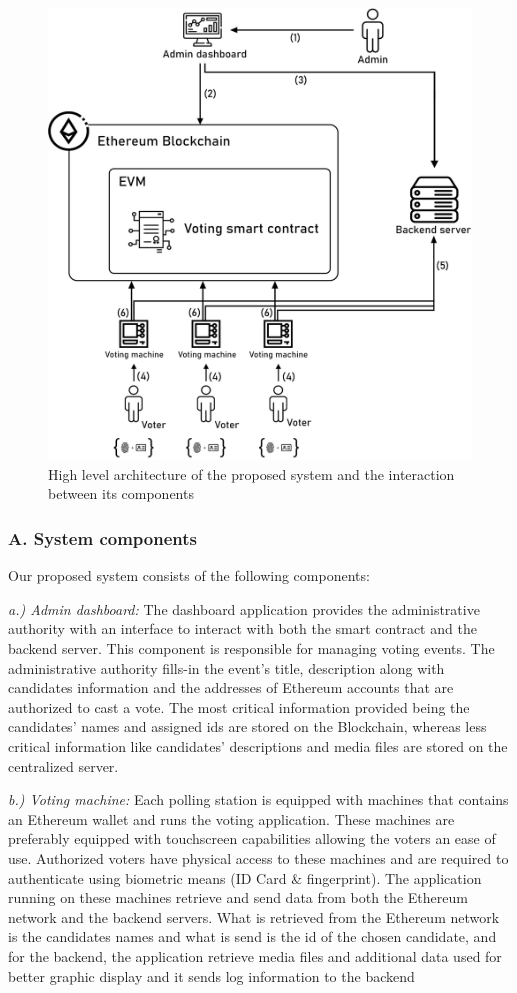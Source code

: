 \begin{figure}[H]
	\centering
		\includegraphics[width=12cm]{images/chapter3/architecture.png}
		\caption{{\footnotesize High level architecture of the proposed system and the interaction between its components}}
\end{figure}

\subsubsection{A. System components}

Our proposed system consists of the following components:

\textit{a.) Admin dashboard:} The dashboard application provides the administrative authority with an interface to interact with both the smart contract and the backend server. This component is responsible for managing voting events. The administrative authority fills-in the event's title, description along with candidates information and the addresses of Ethereum accounts that are authorized to cast a vote. The most critical information provided being the candidates' names and assigned ids are stored on the Blockchain, whereas less critical information like candidates' descriptions and media files are stored on the centralized server.

\textit{b.) Voting machine:} Each polling station is equipped with machines that contains an Ethereum wallet and runs the voting application. These machines are preferably equipped with touchscreen capabilities allowing the voters an ease of use. Authorized voters have physical access to these machines and are required to authenticate using biometric means (ID Card \& fingerprint). The application running on these machines retrieve and send data from both the Ethereum network and the backend servers. What is retrieved from the Ethereum network is the candidates names and what is send is the id of the chosen candidate, and for the backend, the application retrieve media files and additional data used for better graphic display and it sends log information to the backend

